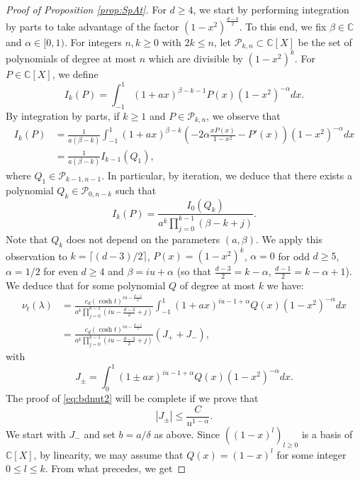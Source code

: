 \documentclass[10pt,a4paper]{amsart}
\newcommand{\C}{\mathds{C}}
\begin{document}
\begin{proof}[Proof of Proposition \ref{prop:SpAt}]
For $d \geq 4$, we start by performing integration by parts to take advantage of the factor $( 1- x^2)^{ \frac{d - 3}{2}}$. 
To this end, we fix $\beta \in \mathbb{C}$ and $\alpha \in [0,1)$. For integers $ n,k \geq 0$ with $2k \leq n$, let $\mathcal P_{k,n} \subset \mathbb{C}[X]$ be the set of polynomials of degree at most $n$ which are divisible by $(1-x^2)^k$.  For $P \in \mathbb{C}[X]$, we define
$$
I_k (P) = \int_{-1}^{1} ( 1+ a x)^{\beta - k-1} P(x) ( 1- x^2)^{ -\alpha} dx.
$$
By integration by parts, if $k \geq 1$ and $P \in \mathcal P_{k,n}$, we observe that 
\begin{align*}
I_k (P) & = \frac{1} {a (\beta -k)}   \int_{-1}^{1} ( 1+ a x)^{\beta - k}  \left (  -2 \alpha \frac{ x P(x)}{1-x^2} - P'(x) \right) ( 1- x^2)^{ -\alpha} dx \\
& = \frac{1} {a (\beta -k)} I_{k-1} (Q_1),
\end{align*}
	  where $Q_1 \in \mathcal P_{k-1,n-1}$. In particular, by iteration, we deduce that there exists a polynomial $Q_k\in \mathcal P_{0,n-k}$ such that 
$$
I_k (P) =  \frac{ I_0(Q_k)} { a^k  \prod_{j=0}^{k-1}  (\beta - k  + j) } . 
$$
Note that $Q_k$ does not depend on the parameters $(a,\beta)$.
	  We apply this observation to $k = \lceil (d-3)/2 \rceil$, $P(x) = (1-x^2)^{   k  }$, $\alpha = 0$ for odd $d \geq 5$, $\alpha = 1/2$ for even $d \geq 4$ and  $\beta = iu + \alpha$ (so that $\frac{d-3}{2} = k - \alpha$, $\frac{d-1}{2} = k - \alpha+1 $). We deduce that for some polynomial $Q$ of degree  at most $k$ we have:
	  				\begin{align*}
	  \nu_t (\lambda)  &= \frac{ c_d (\cosh t )^{iu - \frac{d-1}{2}}}  { a^k  \prod_{j=0}^{k-1}  (i u - \frac{d-3}{2} +j ) }  \int_{-1}^{1} ( 1+ a x)^{iu - 1 + \alpha} Q(x) (1-x^2)^{-\alpha}dx \\
	  & =  \frac{ c_d (\cosh t )^{iu - \frac{d-1}{2}}}  { a^k  \prod_{j=0}^{k-1}  (i u -  \frac{d-3}{2} +j ) } \left( J_+ + J_-\right),  
	   \end{align*}
		with
		$$
		J_{\pm} = \int_{0}^{1} ( 1 \pm a x)^{iu - 1 + \alpha} Q(x) ( 1- x^2)^{ -\alpha}dx.
		$$	
		The proof of \eqref{eq:bdnut2} will be complete if we prove that 
\begin{equation}\label{eq:bdnut2b}
		|J_{\pm}|  \leq   \frac{C}{u^{1-\alpha}}. 
\end{equation}
	We start with $J_-$ and set $b = a /  \delta$ as above. Since $((1-x)^l)_{l \geq 0}$ is a basis of $\C[X]$, by linearity, we may assume that $Q(x) = (1-x)^l$ for some integer $0 \leq l \leq k$. From what precedes, we get

\end{proof}
\end{document}
